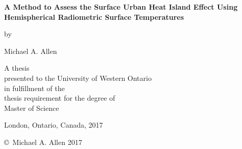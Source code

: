 \pagestyle{empty}

\begin{titlepage}
        \begin{center}
        \vspace*{1.0cm}

        \Huge
        {\bf A Method to Assess the Surface Urban Heat Island Effect Using Hemispherical Radiometric Surface Temperatures}

        \vspace*{1.0cm}

        \normalsize
        by \\

        \vspace*{1.0cm}

        \Large
        Michael A. Allen \\

        \vspace*{3.0cm}

        \normalsize
        A thesis \\
        presented to the University of Western Ontario\\ 
        in fulfillment of the \\
        thesis requirement for the degree of \\
        Master of Science \\

        \vspace*{2.0cm}

        London, Ontario, Canada, 2017 \\

        \vspace*{1.0cm}

        \copyright\ Michael A. Allen 2017 \\
        \end{center}
\end{titlepage}

\pagestyle{plain}
\setcounter{page}{3}

\cleardoublepage %


